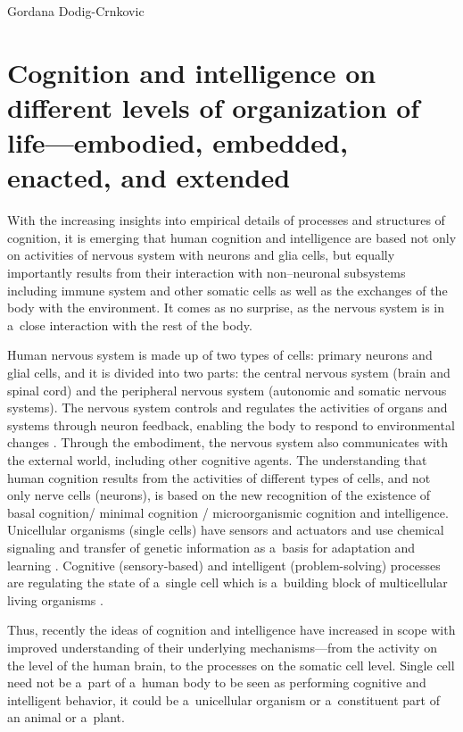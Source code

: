 \begin{artengenv}{Gordana Dodig-Crnkovic}
\section*{Cognition and intelligence on different levels of organization of life---embodied, embedded, enacted, and extended}
With the increasing insights into empirical details of processes and structures of cognition, it is emerging that human cognition and intelligence are based not only on activities of nervous system with neurons and glia cells, but equally importantly results from their interaction with non–neuronal subsystems including immune system and other somatic cells as well as the exchanges of the body with the environment. It comes as no surprise, as the nervous system is in a~close interaction with the rest of the body.

Human nervous system is made up of two types of cells: primary neurons and glial cells, and it is divided into two parts: the central nervous system (brain and spinal cord) and the peripheral nervous system (autonomic and somatic nervous systems). The nervous system controls and regulates the activities of organs and systems through neuron feedback, enabling the body to respond to environmental changes
\parencite[][]{biotechnology-accegen_nervous_2022}. %
 Through the embodiment, the nervous system also communicates with the external world, including other cognitive agents. The understanding that human cognition results from the activities of different types of cells, and not only nerve cells (neurons), is based on the new recognition of the existence of basal cognition/ minimal cognition / microorganismic cognition and intelligence. Unicellular organisms (single cells) have sensors and actuators and use chemical signaling and transfer of genetic information as a~basis for adaptation and learning 
\parencites[][]{baluska_having_2016}[][]{ng_bacterial_2009}[][]{witzany_introduction_2011}[][]{ben-jacob_bacterial_2003}[][]{ben-jacob_seeking_2006}. %
Cognitive (sensory-based) and intelligent (problem-solving) processes are regulating the state of a~single cell which is a~building block of multicellular living organisms 
\parencite[][]{manicka_cognitive_2019}.%


Thus, recently the ideas of cognition and intelligence have increased in scope
\parencite[][]{dennett_bacteria_2017} %
 with improved understanding of their underlying mechanisms---from the activity on the level of the human brain, to the processes on the somatic cell level. Single cell need not be a~part of a~human body to be seen as performing cognitive and intelligent behavior, it could be a~unicellular organism or a~constituent part of an animal or a~plant.


\end{artengenv}
